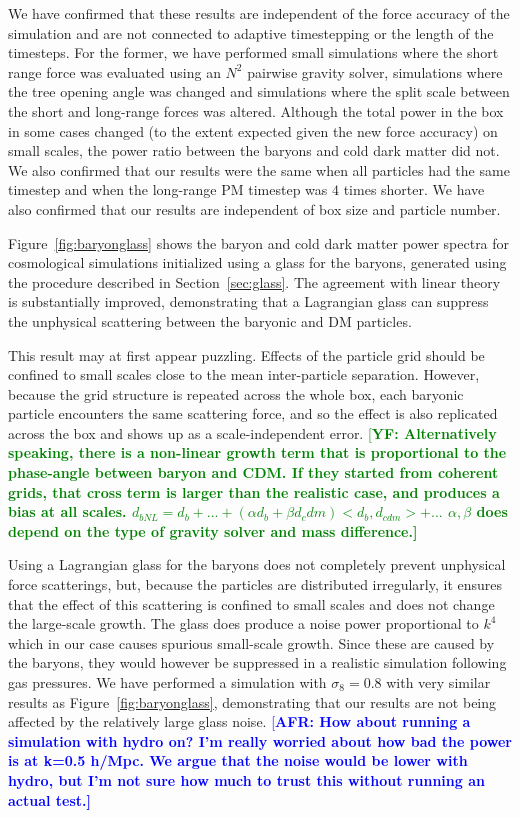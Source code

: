 \documentclass[a4paper,11pt]{article}
\newcommand{\AFR}[1]{\textcolor{blue}{[\bf AFR: #1]} }
\newcommand{\YF}[1]{\textcolor{green}{[\bf YF: #1]} }
\begin{document}
We have confirmed that these results are independent of the force accuracy of the simulation and are not connected to adaptive timestepping or the length of the timesteps. For the former, we have performed small simulations where the short range force was evaluated using an $N^2$ pairwise gravity solver, simulations where the tree opening angle was changed and simulations where the split scale between the short and long-range forces was altered. Although the total power in the box in some cases changed (to the extent expected given the new force accuracy) on small scales, the power ratio between the baryons and cold dark matter did not.
We also confirmed that our results were the same when all particles had the same timestep and when the long-range PM timestep was $4$ times shorter. We have also confirmed that our results are independent of box size and particle number.

Figure~\ref{fig:baryonglass} shows the baryon and cold dark matter power spectra for cosmological simulations initialized using a glass for the baryons, generated using the procedure described in Section~\ref{sec:glass}. The agreement with linear theory is substantially improved, demonstrating that a Lagrangian glass can suppress the unphysical scattering between the baryonic and DM particles.

This result may at first appear puzzling. Effects of the particle grid should be confined to small scales close to the mean inter-particle separation. However, because the grid structure is repeated across the whole box, each baryonic particle encounters the same scattering force, and so the effect is also replicated across the box and shows up as a scale-independent error. \YF{Alternatively speaking, there is a non-linear growth term that is proportional to the phase-angle between baryon and CDM. If they started from coherent grids, that cross term is larger than the realistic case, and produces a bias at all scales. $d_{bNL} = d_{b} + ... + (\alpha d_b + \beta d_cdm) <d_{b}, d_{cdm}> + ...$ $\alpha, \beta$ does depend on the type of gravity solver and mass difference.}

Using a Lagrangian glass for the baryons does not completely prevent unphysical force scatterings, but, because the particles are distributed irregularly, it ensures that the effect of this scattering is confined to small scales and does not change the large-scale growth. The glass does produce a noise power proportional to $k^4$ which in our case causes spurious small-scale growth. Since these are caused by the baryons, they would however be suppressed in a realistic simulation following gas pressures. We have performed a simulation with $\sigma_8 = 0.8$ with very similar results as Figure~\ref{fig:baryonglass}, demonstrating that our results are not being affected by the relatively large glass noise.
\AFR{How about running a simulation with hydro on? I'm really worried about how bad the power is at k=0.5 h/Mpc. We argue that the noise would be lower with hydro, but I'm not sure how much to trust this without running an actual test.}
\end{document}
